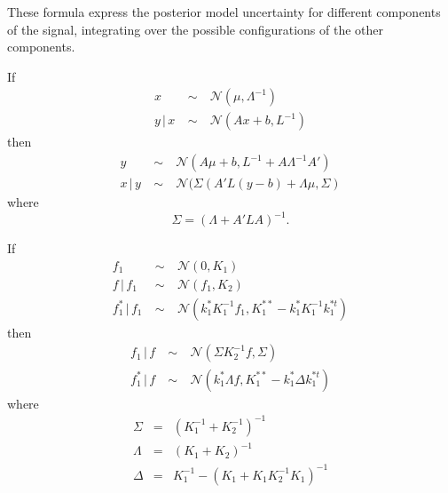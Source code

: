 \documentclass[twoside]{article}
\theoremstyle{definition}
\theoremstyle{remark}
\numberwithin{equation}{section}
\numberwithin{thm}{section}
\newcommand{\Normal}{\mathcal{N}}
\newcommand{\dist}{\ \sim\ }
\def\given{\,|\,}
\begin{document}
These formula express the posterior model uncertainty for different components of the signal, integrating over the possible configurations of the other components.

\begin{lem}
\label{lem:cond}
If
\begin{eqnarray}
x & \dist & \Normal(\mu, \Lambda^{-1}) \\
y \given x & \dist & \Normal(Ax + b, L^{-1})
\end{eqnarray}
then
\begin{eqnarray}
y & \dist & \Normal(A\mu + b, L^{-1} + A\Lambda^{-1}A') \\
x \given y & \dist & \Normal(\Sigma(A'L(y-b) + \Lambda\mu, \Sigma)
\end{eqnarray}
where
\begin{equation}
\Sigma = (\Lambda + A'LA)^{-1}.
\end{equation}
\end{lem}
\begin{prop}
If
\begin{eqnarray}
f_1 & \dist & \Normal(0, K_1) \\
f \given f_1 & \dist & \Normal(f_1, K_2) \\
f_1^* \given f_1 & \dist & \Normal(k_1^*K_1^{-1}f_1, K_1^{**} - k_1^*K_1^{-1}k_1^{*t})
\end{eqnarray}
then
\begin{eqnarray}
f_1 \given f & \dist & \Normal(\Sigma K_2^{-1}f, \Sigma) \\
f_1^* \given f & \dist & \Normal(k_1^*\Lambda f, K_1^{**} - k_1^*\Delta k_1^{*t})
\end{eqnarray}
where
\begin{eqnarray}
\Sigma & = & (K_1^{-1} + K_2^{-1})^{-1} \\
\Lambda & = & (K_1 + K_2)^{-1} \\
\Delta & = & K_1^{-1} - (K_1 + K_1K_2^{-1}K_1)^{-1}
\end{eqnarray}
\end{prop}
\end{document}
